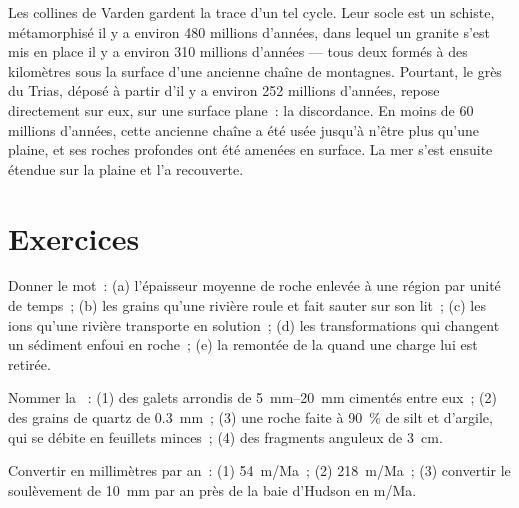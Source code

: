 Les collines de Varden gardent la trace d'un tel cycle. Leur socle est un
schiste, métamorphisé il y a environ 480 millions d'années, dans lequel un
granite s'est mis en place il y a environ 310 millions d'années --- tous
deux formés à des kilomètres sous la surface d'une ancienne chaîne de
montagnes. Pourtant, le grès du Trias, déposé à partir d'il y a environ
252 millions d'années, repose directement sur eux, sur une surface plane~:
la discordance. En moins de 60 millions d'années, cette ancienne chaîne a
été usée jusqu'à n'être plus qu'une plaine, et ses roches profondes ont été
amenées en surface. La mer s'est ensuite étendue sur la plaine et l'a
recouverte.

\section{Exercices}

\begin{exercise}[$\star$]\label{exo:g12:destruction-of-mountains:1}
Donner le mot~: (a) l'épaisseur moyenne de roche enlevée à une région par
unité de temps~; (b) les grains qu'une rivière roule et fait sauter sur son
lit~; (c) les ions qu'une rivière transporte en solution~; (d) les
transformations qui changent un sédiment enfoui en roche~; (e) la remontée
de la  quand une charge lui est retirée.
\end{exercise}

\begin{exercise}[$\star$]\label{exo:g12:destruction-of-mountains:2}
Nommer la ~: (1) des galets arrondis de
\qtyrange{5}{20}{mm} cimentés entre eux~; (2) des grains de quartz de
\qty{0.3}{mm}~; (3) une roche faite à \qty{90}{\percent} de silt et
d'argile, qui se débite en feuillets minces~; (4) des fragments anguleux de
\qty{3}{cm}.
\end{exercise}

\begin{exercise}[$\star$]\label{exo:g12:destruction-of-mountains:3}
Convertir en millimètres par an~: (1) \qty{54}{m/Ma}~; (2) \qty{218}{m/Ma}~;
(3) convertir le soulèvement de \qty{10}{mm} par an près de la baie
d'Hudson en \unit{m/Ma}.
\end{exercise}

